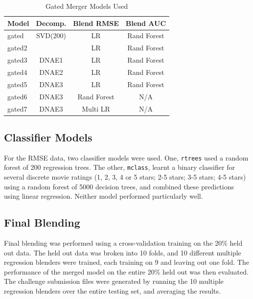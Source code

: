 \documentclass{article}
\begin{document}
\begin{table}
\caption{Gated Merger Models Used}
\label{table:gated-models}
\vskip 0.15in
\begin{center}
\begin{small}
\begin{sc}
\begin{tabular}{lccc}
\hline
\abovespace\belowspace
Model & Decomp. & Blend RMSE & Blend AUC \\
\hline
\abovespace
gated   & SVD(200)  & LR & Rand Forest  \\
gated2  &           & LR & Rand Forest  \\
gated3  & DNAE1     & LR & Rand Forest  \\
gated4  & DNAE2     & LR & Rand Forest  \\
gated5  & DNAE3     & LR & Rand Forest  \\
gated6  & DNAE3     & Rand Forest & N/A  \\
\belowspace
gated7  & DNAE3     & Multi LR & N/A   \\
\hline
\end{tabular}
\end{sc}
\end{small}
\end{center}
\vskip -0.1in
\end{table}

\subsection{Classifier Models}

For the RMSE data, two classifier models were used.  One, \texttt{rtrees} used a random forest of 200 regression trees.  The other, \texttt{mclass}, learnt a binary classifier for several discrete movie ratings (1, 2, 3, 4 or 5 stars; 2-5 stars; 3-5 stars; 4-5 stars) using a random forest of 5000 decision trees, and combined these predictions using linear regression.  Neither model performed particularly well.

\subsection{Final Blending}

Final blending was performed using a cross-validation training on the 20\% held out data.  The held out data was broken into 10 folds, and 10 different multiple regression blenders were trained, each training on 9 and leaving out one fold.
The performance of the merged model on the entire 20\% held out was then evaluated.
The challenge submission files were generated by running the 10 multiple regression blenders over the entire testing set, and averaging the results.
\end{document}

